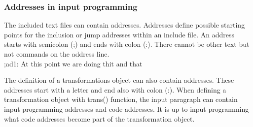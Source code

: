 \subsubsection{Addresses in input programming}
\label{inpuad}
The included text files can contain addresses. Addresses define possible starting points for the
inclusion or jump addresses within an include file. An address starts with semicolon (;) and
ends with colon (:). There cannot be other text but not commands on the address line.
\\
;ad1:  At this point we are doing thit and that
\\
\begin{note}
The definition of a transformations object can also contain addresses. These addresses start
with a letter and end also with colon (:). When defining a transformation object with \textcolor{VioletRed}{trans}() function,
the input paragraph can contain input programming addresses and code addresses. It is up to
input programming what code addresses become part of the transformation object.
\end{note}
